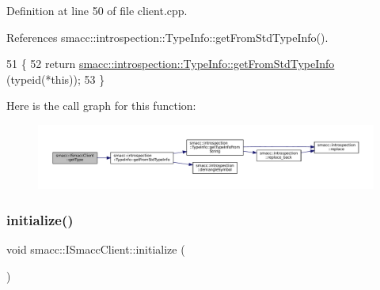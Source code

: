 Definition at line 50 of file client.\+cpp.



References smacc\+::introspection\+::\+Type\+Info\+::get\+From\+Std\+Type\+Info().


\begin{DoxyCode}
51 \{
52     \textcolor{keywordflow}{return} \hyperlink{classsmacc_1_1introspection_1_1TypeInfo_ada1e604cd8bf968a5f816fbace4af881}{smacc::introspection::TypeInfo::getFromStdTypeInfo}
      (\textcolor{keyword}{typeid}(*\textcolor{keyword}{this}));
53 \}
\end{DoxyCode}
Here is the call graph for this function\+:
\nopagebreak
\begin{figure}[H]
\begin{center}
\leavevmode
\includegraphics[width=350pt]{classsmacc_1_1ISmaccClient_ae7faf4e40510c73810e6b0ef9fec8f33_cgraph}
\end{center}
\end{figure}
\mbox{\label{classsmacc_1_1ISmaccClient_a974ebb6ad6cf812e7b9de6b78b3d901f}} 
\subsubsection{\texorpdfstring{initialize()}{initialize()}}
{\footnotesize\ttfamily void smacc\+::\+I\+Smacc\+Client\+::initialize (\begin{DoxyParamCaption}{ }\end{DoxyParamCaption})\hspace{0.3cm}{\ttfamily [virtual]}}




